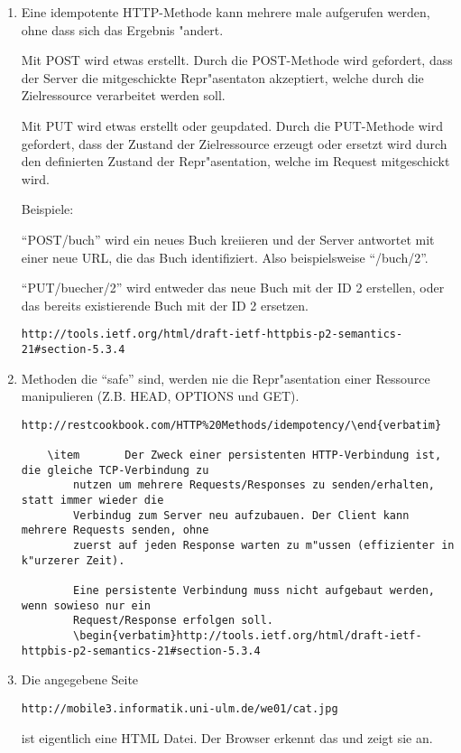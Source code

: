 \documentclass[11pt, oneside, BCOR0mm, DIV9, headinclude]{scrartcl}
\begin{document}
\begin{enumerate}
    \item 	Eine idempotente HTTP-Methode kann mehrere male aufgerufen werden, ohne dass sich
		das Ergebnis "andert.

		Mit POST wird etwas erstellt.
		Durch die POST-Methode wird gefordert, dass der Server die mitgeschickte Repr"asentaton 
		akzeptiert, welche durch die Zielressource verarbeitet werden soll.

		Mit PUT wird etwas erstellt oder geupdated.
		Durch die PUT-Methode wird gefordert, dass der Zustand der Zielressource erzeugt oder 
		ersetzt wird durch den definierten Zustand der Repr"asentation, welche im Request 
		mitgeschickt wird.


		Beispiele:

		``POST/buch'' wird ein neues Buch kreiieren und
		der Server antwortet mit einer neue URL, die das Buch identifiziert.
		Also beispielsweise ``/buch/2''.

		``PUT/buecher/2'' wird entweder das neue Buch mit der ID 2 erstellen, oder das 
		bereits existierende Buch mit der ID 2 ersetzen.
		\begin{verbatim}http://tools.ietf.org/html/draft-ietf-httpbis-p2-semantics-21#section-5.3.4 \end{verbatim}


    \item       Methoden die ``safe'' sind, werden nie die Repr"asentation einer Ressource
	        manipulieren (Z.B. HEAD, OPTIONS und GET).
		\begin{verbatim}http://restcookbook.com/HTTP%20Methods/idempotency/\end{verbatim}

    \item       Der Zweck einer persistenten HTTP-Verbindung ist, die gleiche TCP-Verbindung zu
		nutzen um mehrere Requests/Responses zu senden/erhalten, statt immer wieder die 
		Verbindug zum Server neu aufzubauen. Der Client kann mehrere Requests senden, ohne 
		zuerst auf jeden Response warten zu m"ussen (effizienter in k"urzerer Zeit).
		
		Eine persistente Verbindung muss nicht aufgebaut werden, wenn sowieso nur ein
		Request/Response erfolgen soll.
		\begin{verbatim}http://tools.ietf.org/html/draft-ietf-httpbis-p2-semantics-21#section-5.3.4 \end{verbatim}

	\item   Die angegebene Seite \begin{verbatim}http://mobile3.informatik.uni-ulm.de/we01/cat.jpg\end{verbatim}
		ist eigentlich eine HTML Datei. Der Browser erkennt das und zeigt sie an.


\end{enumerate}
\end{document}
